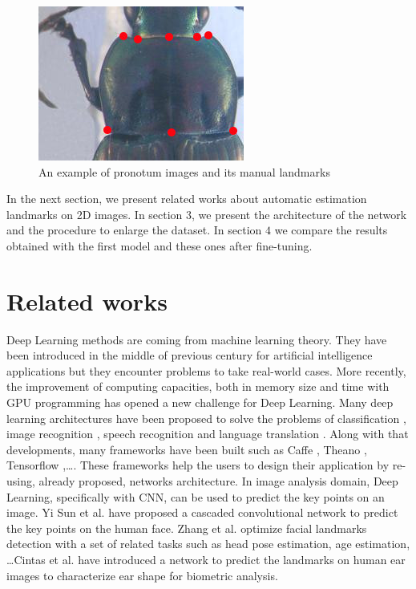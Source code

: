 \documentclass[10pt]{article}
\begin{document}
\begin{figure}[htbp]
\centering
	\centerline{\includegraphics[scale=0.8]{images/pronotum}}
	\caption{\small{An example of pronotum images and its manual landmarks}}
	\label{figpronotum}
\end{figure}

In the next section, we present related works about automatic
estimation landmarks on 2D images. In section $3$, we present the
architecture of the network and the procedure to enlarge the dataset. In section $4$ we compare the results obtained with the first
model and these ones after fine-tuning. 


\section{Related works}
Deep Learning methods are coming from machine learning theory. They
have been introduced in the middle of previous century for artificial
intelligence applications but they encounter problems to
take real-world cases. More recently, the improvement of computing capacities, both in
memory size and time with GPU programming has opened a new challenge  
for Deep Learning. Many deep learning architectures have been proposed
to solve the problems of classification \cite{krizhevsky2012imagenet,
  ciregan2012multi}, image recognition \cite{szegedy2015going,
  farabet2013learning, li2015convolutional}, speech recognition
\cite{mikolov2011strategies, hinton2012deep} and language translation
\cite{jean2014using, sutskever2014sequence}. Along with that
developments, many frameworks have been built such as Caffe
\cite{jia2014caffe}, Theano \cite{2016arXiv160502688short}, Tensorflow
\cite{tensorflow2015},\ldots. These frameworks help
the users to design their application by re-using, already proposed, networks
architecture. In image analysis domain,
Deep Learning, specifically with CNN, can be used to predict the key points on
an image. Yi Sun et al. \cite{sun2013deep} have proposed a cascaded
convolutional network to predict the key points on the human
face. Zhang et al. \cite{zhang2014facial} optimize facial landmarks
detection with a set of related tasks such as head pose estimation,
age estimation, \ldots Cintas et al. \cite{cintas2016automatic} have
introduced a network to predict the landmarks on human ear images to
characterize ear shape for biometric analysis.
\end{document}
